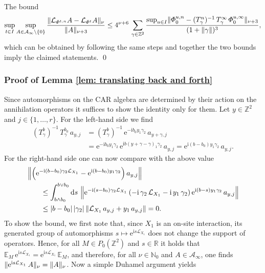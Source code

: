 \documentclass[a4paper]{article}
\newcommand{\E}{\mathbb{E}}
\newcommand{\e}{\mathrm{e}}
\renewcommand{\i}{\mathrm{i}}
\renewcommand{\Phi}{\varPhi}
\newcommand{\fd}{r}
\newcommand{\g}{\gamma}
\newcommand{\N}{\mathbb{N}}
\newcommand{\Z}{\mathbb{Z}}
\newcommand{\mA}{\mathcal{A}}
\newcommand{\R}{\mathbb{R}}
\newcommand{\mL}{\mathcal{L}}
\newcommand{\dd}{\mathrm{d}}
\DeclarePairedDelimiter\norm{\lVert}{\rVert}
\DeclarePairedDelimiter\abs{\lvert}{\rvert}
\theoremstyle{plain}
\theoremstyle{definition}
\theoremstyle{remark}
\renewcommand{\(}{\left(}
\renewcommand{\)}{\right)}
\begin{document}
    The bound 
    \begin{align*}
        \sup_{t\in I} \sup_{A\in \mA_\infty\setminus\{0\}} \frac{\norm{\mL_{\Phi^{t,n}} A - \mL_{\Phi^t} A }_{\nu}}{\norm{A}_{\nu+3}} 
        \leq
        4^{\nu+6}\,  \sum_{\g \in \Z^2}  \frac{\sup_{u\in I} \lVert \Phi^{u,n}_0 - (T_\g^n)^{-1}\,T_\g^\infty \,  \Phi^{u,\infty}_0 \rVert_{\nu+3} }{(1+\lVert \g \rVert)^3}
        ,
    \end{align*}
    which can be obtained by following the same steps and together the two bounds imply the claimed statements.
\qed









 
\subsubsection{Proof of Lemma \ref{lem: translating back and forth}}\label{proof:translating back and forth}
    Since automorphisms on the CAR algebra are determined by their action on the annihilation operators it suffices to show the identity only for them. Let $y\in \Z^2$ and $j\in \{1,\dots, \fd\}$. For the left-hand side we find
    \begin{align*}
        (T^b_\g)^{-1}\, T_\g^{b_0} \, a_{y,j}
        &= (T^b_\g)^{-1}\,\e^{-\i b_0 y_1 \g_2}\, a_{y+\g,j}
        \\
        &= \e^{-\i b_0 y_1 \g_2} \, \e^{\i b (y+\g-\g)_1 \g_2}\, a_{y,j} 
        = \e^{\i (b-b_0) y_1 \g_2} \, a_{y,j}
        .
    \end{align*}
    For the right-hand side one can now compare with the above value
    \begin{align*}
        \hspace{2em}&\hspace{-2em}
        \left\| \left( \e^{-\i (b-b_0) \g_2 \mL_{X_1}}  - \e^{\i (b-b_0) y_1 \g_2} \right)  a_{y,j}\right\|
        \\
        &\leq
        \int_{b \land b_0}^{ b \lor b_0} \dd s   \, \left\| \e^{-\i (s-b_0) \g_2 \mL_{X_1}} \, (-\i\, \g_2 \, \mL_{X_1} - \i  \, y_1 \, \g_2 ) \, \e^{\i (b-s) y_1 \g_2} \, a_{y,j}\right\|
        \\
        &\leq
        \abs{b-b_0}   \, \abs{\g_2} \, \norm{  \mL_{X_1}\, a_{y,j} +  y_1 \,  a_{y,j}} = 0
        .
    \end{align*}
    To show the bound, we first note that, since $X_1$ is an on-site interaction, its generated group of automorphisms $s \mapsto \e^{\i s  \mL_{X_1}}$ does not change the support of operators. Hence, for all $M\in P_0(\Z^2)$ and $s\in \R$ it holds that $\E_M \, \e^{\i s  \mL_{X_1}} = \e^{\i s  \mL_{X_1}} \, \E_M$, and therefore, for all $\nu \in \N_0$ and $A \in  \mA_\infty$, one finds $\norm{\e^{\i s  \mL_{X_1}}\, A}_\nu = \norm{A}_\nu$. Now a simple Duhamel argument yields
\end{document}

